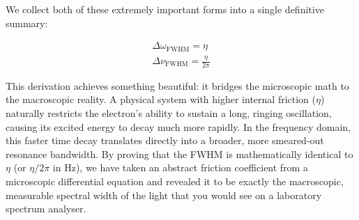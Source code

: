 We collect both of these extremely important forms into a single definitive summary:

\begin{keyresult}
    \begin{gather}
        \Delta\omega_{\text{FWHM}} = \eta \nonumber \\[1ex]
        \Delta\nu_{\text{FWHM}} = \frac{\eta}{2\pi}
    \end{gather}
\end{keyresult}

This derivation achieves something beautiful: it bridges the microscopic math to the macroscopic reality. A physical system with higher internal friction ($\eta$) naturally restricts the electron's ability to sustain a long, ringing oscillation, causing its excited energy to decay much more rapidly. In the frequency domain, this faster time decay translates directly into a broader, more smeared-out resonance bandwidth. By proving that the FWHM is mathematically identical to $\eta$ (or $\eta/2\pi$ in Hz), we have taken an abstract friction coefficient from a microscopic differential equation and revealed it to be exactly the macroscopic, measurable spectral width of the light that you would see on a laboratory spectrum analyser.

